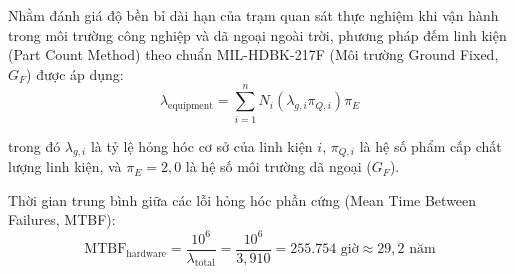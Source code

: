 \hspace{0.5cm} Nhằm đánh giá độ bền bỉ dài hạn của trạm quan sát thực nghiệm khi vận hành trong môi trường công nghiệp và dã ngoại ngoài trời, phương pháp đếm linh kiện (Part Count Method) theo chuẩn MIL-HDBK-217F (Môi trường Ground Fixed, $G_F$) được áp dụng:
\begin{equation}
\lambda_{\text{equipment}} = \sum_{i=1}^n N_i \left( \lambda_{g, i} \pi_{Q, i} \right) \pi_E
\label{eq:mil-hdbk-217f-formula}
\end{equation}

trong đó $\lambda_{g, i}$ là tỷ lệ hỏng hóc cơ sở của linh kiện $i$, $\pi_{Q, i}$ là hệ số phẩm cấp chất lượng linh kiện, và $\pi_E = 2{,}0$ là hệ số môi trường dã ngoại ($G_F$).

\begin{table}[H]
\centering
\caption{Dự toán tỷ lệ hỏng hóc và thời gian trung bình giữa các lỗi (MTBF) theo chuẩn MIL-HDBK-217F}
\label{tab:mil-hdbk-217f-breakdown}
\end{table}

Thời gian trung bình giữa các lỗi hỏng hóc phần cứng (Mean Time Between Failures, MTBF):
\begin{equation}
\text{MTBF}_{\text{hardware}} = \frac{10^6}{\lambda_{\text{total}}} = \frac{10^6}{3{,}910} = 255.754\text{ giờ} \approx 29{,}2\text{ năm}
\label{eq:mtbf-hardware-calculation}
\end{equation}

